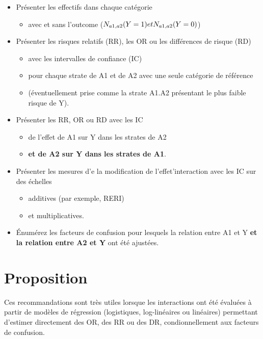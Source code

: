 \documentclass[
]{book}
\providecommand{\tightlist}{%
  \setlength{\itemsep}{0pt}\setlength{\parskip}{0pt}}
\begin{document}
\begin{itemize}
\tightlist
\item
  Présenter les effectifs dans chaque catégorie

  \begin{itemize}
  \tightlist
  \item
    avec et sans l'outcome (\(\small N_{a1,a2}(Y=1) et N_{a1,a2}(Y=0)\))
  \end{itemize}
\item
  Présenter les risques relatifs (RR), les OR ou les différences de risque (RD)

  \begin{itemize}
  \tightlist
  \item
    avec les intervalles de confiance (IC)
  \item
    pour chaque strate de A1 et de A2 avec une seule catégorie de référence
  \item
    (éventuellement prise comme la strate A1.A2 présentant le plus faible risque de Y).
  \end{itemize}
\item
  Présenter les RR, OR ou RD avec les IC

  \begin{itemize}
  \tightlist
  \item
    de l'effet de A1 sur Y dans les strates de A2
  \item
    \textbf{et de A2 sur Y dans les strates de A1}.
  \end{itemize}
\item
  Présenter les mesures d'e la modification de l'effet'interaction avec les IC sur des échelles

  \begin{itemize}
  \tightlist
  \item
    additives (par exemple, RERI)
  \item
    et multiplicatives.
  \end{itemize}
\item
  Énumérez les facteurs de confusion pour lesquels la relation entre A1 et Y \textbf{et la relation entre A2 et Y} ont été ajustées.
\end{itemize}

\hypertarget{proposition}{%
\section{Proposition}\label{proposition}}

Ces recommandations sont très utiles lorsque les interactions ont été évaluées à partir de modèles de régression (logistiques, log-linéaires ou linéaires) permettant d'estimer directement des OR, des RR ou des DR, condionnellement aux facteurs de confusion.
\end{document}
